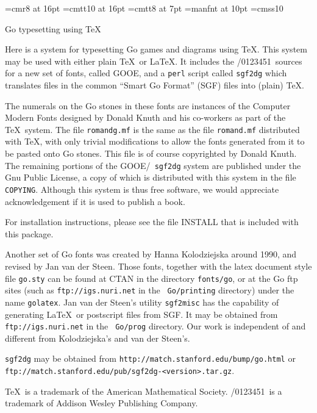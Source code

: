 

\font\titlefont=cmr8 at 16pt
\font\titlett=cmtt10 at 16pt
\font\seventtt=cmtt8 at 7pt
\font\metafnt=manfnt at 10pt
\font\gofont=cmss10
\def\metafont{{\metafnt/0123451}}
\def\\{{\char'134}}

\vfil
\centerline{\titlefont Go typesetting using \TeX}

\bigbreak
Here is a system for typesetting Go games and diagrams using \TeX.
This system may be used with either plain \TeX\ or La\TeX. It includes 
the \metafont\ sources for a new set of fonts, called GOOE, and a {\tt perl}
script called {\tt sgf2dg} which translates files in the common ``Smart Go
Format'' (SGF) files into (plain) \TeX.

The numerals on the Go stones in these fonts are instances of the Computer
Modern Fonts designed by Donald Knuth and his co-workers as part of the
\TeX\ system. The file {\tt romandg.mf} is the same as the file 
{\tt romand.mf} distributed with \TeX, with only trivial modifications 
to allow the fonts generated from it to be pasted onto Go stones. This file is
of course copyrighted by Donald Knuth. The remaining portions of the GOOE/{\tt
sgf2dg} system are published under the Gnu Public License, a copy of which is
distributed with this system in the file {\tt COPYING}. Although this system
is thus free software, we would appreciate acknowledgement if it is used to
publish a book.

For installation instructions, please see the file INSTALL that
is included with this package.

Another set of Go fonts was created by Hanna Kolodziejska around 1990, and
revised by Jan van der Steen. Those fonts, together with the latex document
style file {\tt go.sty} can be found at CTAN in the directory {\tt fonts/go},
or at the Go ftp sites (such as {\tt ftp://igs.nuri.net} in the {\tt
Go/printing} directory) under the name {\tt golatex}. Jan van der Steen's
utility {\tt sgf2misc} has the capability of generating La\TeX\ or postscript
files from SGF. It may be obtained from {\tt ftp://igs.nuri.net} in the {\tt
Go/prog} directory. Our work is independent of and different from
Kolodziejska's and van der Steen's.

{\tt sgf2dg} may be obtained from 
{\tt http://match.stanford.edu/bump/go.html}\hfil\break 
or {\tt ftp://match.stanford.edu/pub/sgf2dg-<version>.tar.gz}.

\TeX\ is a trademark of the American Mathematical Society. \metafont\ is
a trademark of Addison Wesley Publishing Company.

